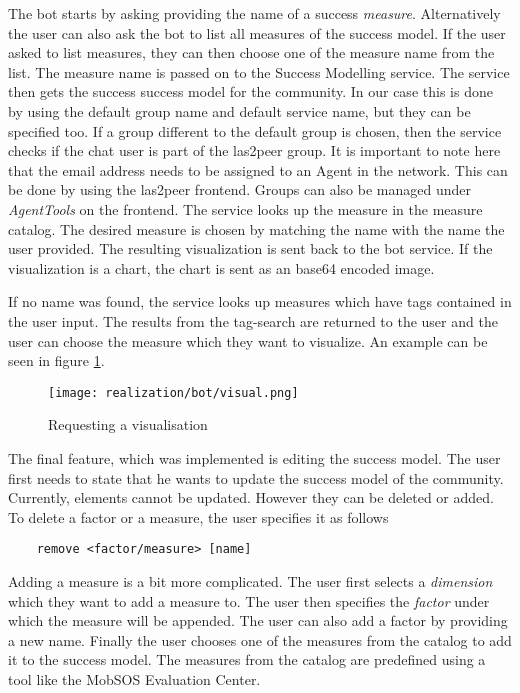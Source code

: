 The bot starts by asking providing the name of a success \emph{measure}. Alternatively the user can also ask the bot to list all measures of the success model.
If the user asked to list measures, they can then choose one of the measure name from the list. 
The measure name is passed on to the Success Modelling service. The service then gets the success success model for the community. In our case this is done by using the default group name and default service name, but they can be specified too.
If a group different to the default group is chosen, then the service checks if the chat user is part of the las2peer group. 
It is important to note here that the email address needs to be assigned to an Agent in the network. 
This can be done by using the las2peer frontend. 
Groups can also be managed under \emph{AgentTools} on the frontend.  
The service looks up the measure in the measure catalog. The desired measure is chosen by matching the name with the name the user provided. 
The resulting visualization is sent back to the bot service. If the visualization is a chart, the chart is sent as an base64 encoded image.

If no name was found, the service looks up measures which have tags contained in the user input. The results from the tag-search are returned to the user and the user can choose the measure which they want to visualize.
An example can be seen in figure \ref{fig:visualReq}.
\begin{figure}[h]
    \centering
    \texttt{[image: realization/bot/visual.png]}
    \caption{Requesting a visualisation}
    \label{fig:visualReq}
\end{figure}


The final feature, which was implemented is editing the success model. The user first needs to state that he wants to update the success model of the community.
Currently, elements cannot be updated. 
However they can be deleted or added. 
To delete a factor or a measure, the user specifies it as follows \begin{lstlisting}
    remove <factor/measure> [name]
\end{lstlisting}  
Adding a measure is a bit more complicated. The user first selects a \emph{dimension} which they want to add a measure to. The user then specifies the \emph{factor} under which the measure will be appended. The user can also add a factor by providing a new name. Finally the user chooses one of the measures from the catalog to add it to the success model. 
The measures from the catalog are predefined using a tool like the MobSOS Evaluation Center. 

